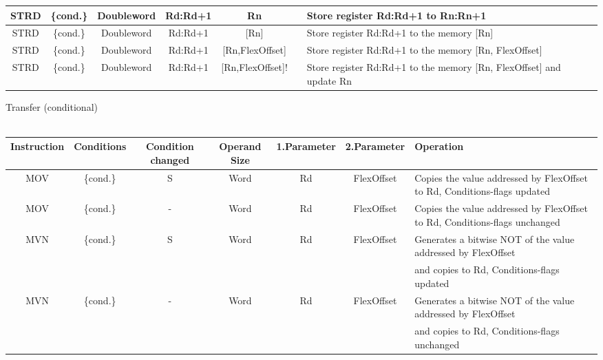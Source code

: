 {\begin{landscape}
\begin{tabular}{|c|c|c|c|c|c|l|}
\hline
\hline
STRD & \{cond.\} & Doubleword & Rd:Rd+1 & Rn &  & Store register Rd:Rd+1 to Rn:Rn+1\\
\hline
STRD & \{cond.\} & Doubleword & Rd:Rd+1 & [Rn] &  & Store register Rd:Rd+1 to the memory [Rn]\\
\hline
STRD & \{cond.\} & Doubleword & Rd:Rd+1 & [Rn,FlexOffset] &  & Store register Rd:Rd+1 to the memory [Rn, FlexOffset]\\
\hline
STRD & \{cond.\} & Doubleword & Rd:Rd+1 & [Rn,FlexOffset]! &  & Store register Rd:Rd+1 to the memory [Rn, FlexOffset] and update Rn\\
\hline
\end{tabular}
\bigskip
\newline
{\rot Transfer (conditional)}\\
\\
\begin{tabular}{|c|c|c|c|c|c|l|}
\hline
Instruction & Conditions & Condition changed & Operand Size & 1.Parameter & 2.Parameter  & Operation\\
\hline
MOV & \{cond.\} & S & Word & Rd & FlexOffset & Copies the value addressed by FlexOffset to Rd, Conditions-flags updated\\
\hline
MOV & \{cond.\} & - & Word & Rd & FlexOffset & Copies the value addressed by FlexOffset to Rd, Conditions-flags unchanged\\
\hline
MVN & \{cond.\} & S & Word & Rd & FlexOffset & Generates a bitwise NOT of the value addressed by FlexOffset \\
    &           &   &      &    &            & and copies to Rd, Conditions-flags updated\\
\hline
MVN & \{cond.\} & - & Word & Rd & FlexOffset & Generates a bitwise NOT of the value addressed by FlexOffset \\
    &		&   &      &    &            & and copies to Rd, Conditions-flags unchanged\\
\hline
\end{tabular}
\bigskip


\end{landscape}}
